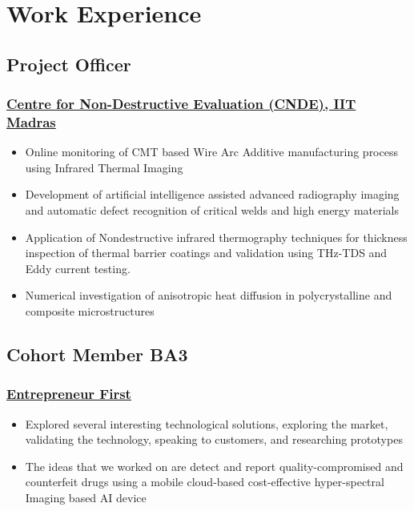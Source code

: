 \documentclass{my_cv}%
\begin{document}
\section{Work Experience}
\vspace{1.0em}
\subsection{Project Officer}
\subsubsection{\href{https://www.cnde.in/}{Centre for Non-Destructive Evaluation (CNDE), IIT Madras}}
\begin{itemize}[leftmargin=0.15in]
\setlength\itemsep{-0.1em}
\color{mygray}
\item Online monitoring of CMT based Wire Arc Additive manufacturing process using Infrared Thermal Imaging
\item Development of artificial intelligence assisted advanced radiography imaging and automatic defect recognition of critical welds and high energy materials
\item Application of Nondestructive infrared thermography techniques for thickness inspection of thermal barrier coatings and validation using THz-TDS and Eddy current testing.
\item Numerical investigation of anisotropic heat diffusion in polycrystalline and composite microstructures
\end{itemize}%
{\color{mygray1} \hdashrule[0.1ex]{18.8cm}{0.2mm}{1mm}}
\subsection{Cohort Member BA3}
\subsubsection{\href{https://www.joinef.com/}{Entrepreneur First}}
\begin{itemize}[leftmargin=0.15in]
\setlength\itemsep{-0.1em}
\color{mygray}
\item Explored several interesting technological solutions, exploring the market, validating the technology, speaking to customers, and researching prototypes
\item The ideas that we worked on are detect and report quality-compromised and counterfeit drugs using a mobile cloud-based cost-effective hyper-spectral Imaging based AI device
\end{itemize}
{\color{mygray1} \hdashrule[0.1ex]{18.8cm}{0.2mm}{1mm}}
\end{document}

